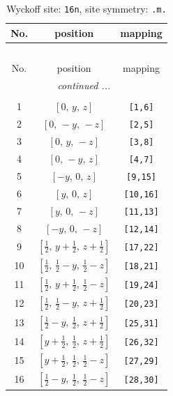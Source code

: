 \documentclass[fleqn,8pt]{jsarticle}
\begin{document}
\renewcommand{\arraystretch}{1.2}
\begin{longtable}{ccc}
\caption{Wyckoff site: {\tt 16n}, site symmetry: {\tt .m.}}
 \\
 \hline \hline
No. & position & mapping \\ \hline \endfirsthead

\multicolumn{2}{l}{\tablename\ \thetable{}} \\
 \hline \hline
No. & position & mapping \\ \hline \endhead

 \hline \hline
\multicolumn{2}{r}{\footnotesize\it continued ...} \\ \endfoot

 \hline \hline
\multicolumn{2}{r}{} \\ \endlastfoot

1 & $\left[ 0,\, y,\, z \right]$ & {\tt [1,6]} \\ \hline
2 & $\left[ 0,\, - y,\, - z \right]$ & {\tt [2,5]} \\ \hline
3 & $\left[ 0,\, y,\, - z \right]$ & {\tt [3,8]} \\ \hline
4 & $\left[ 0,\, - y,\, z \right]$ & {\tt [4,7]} \\ \hline
5 & $\left[ - y,\, 0,\, z \right]$ & {\tt [9,15]} \\ \hline
6 & $\left[ y,\, 0,\, z \right]$ & {\tt [10,16]} \\ \hline
7 & $\left[ y,\, 0,\, - z \right]$ & {\tt [11,13]} \\ \hline
8 & $\left[ - y,\, 0,\, - z \right]$ & {\tt [12,14]} \\ \hline
9 & $\left[ \frac{1}{2},\, y + \frac{1}{2},\, z + \frac{1}{2} \right]$ & {\tt [17,22]} \\ \hline
10 & $\left[ \frac{1}{2},\, \frac{1}{2} - y,\, \frac{1}{2} - z \right]$ & {\tt [18,21]} \\ \hline
11 & $\left[ \frac{1}{2},\, y + \frac{1}{2},\, \frac{1}{2} - z \right]$ & {\tt [19,24]} \\ \hline
12 & $\left[ \frac{1}{2},\, \frac{1}{2} - y,\, z + \frac{1}{2} \right]$ & {\tt [20,23]} \\ \hline
13 & $\left[ \frac{1}{2} - y,\, \frac{1}{2},\, z + \frac{1}{2} \right]$ & {\tt [25,31]} \\ \hline
14 & $\left[ y + \frac{1}{2},\, \frac{1}{2},\, z + \frac{1}{2} \right]$ & {\tt [26,32]} \\ \hline
15 & $\left[ y + \frac{1}{2},\, \frac{1}{2},\, \frac{1}{2} - z \right]$ & {\tt [27,29]} \\ \hline
16 & $\left[ \frac{1}{2} - y,\, \frac{1}{2},\, \frac{1}{2} - z \right]$ & {\tt [28,30]} \\
\end{longtable}
\end{document}
